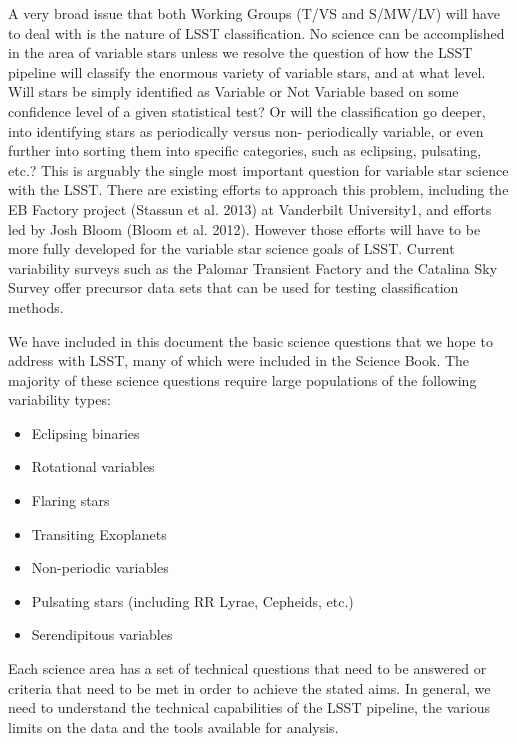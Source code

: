 A very broad issue that both Working Groups (T/VS and S/MW/LV) will have to deal with is the nature of LSST classification. No science can be accomplished in the area of variable stars unless we resolve the question of how the LSST pipeline will classify the enormous variety of variable stars, and at what level. Will stars be simply identified as Variable or Not Variable based on some confidence level of a given statistical test? Or will the classification go deeper, into identifying stars as periodically versus non- periodically variable, or even further into sorting them into specific categories, such as eclipsing, pulsating, etc.? This is arguably the single most important question for variable star science with the LSST. There are existing efforts to approach this problem, including the EB Factory project (Stassun et al. 2013) at Vanderbilt University1, and efforts led by Josh Bloom (Bloom et al. 2012). However those efforts will have to be more fully developed for the variable star science goals of LSST. Current variability surveys such as the Palomar Transient Factory and the Catalina Sky Survey offer precursor data sets that can be used for testing classification methods. 

We have included in this document the basic science questions that we hope to address with LSST, many of which were included in the Science Book. The majority of these science questions require large populations of the following variability types: 
\begin{itemize}
\item Eclipsing binaries 
\item Rotational variables 
\item Flaring stars 
\item Transiting Exoplanets 
\item Non-periodic variables 
\item Pulsating stars (including RR Lyrae, Cepheids, etc.) 
\item Serendipitous variables 
\end{itemize}

Each science area has a set of technical questions that need to be answered or criteria that need to be met in order to achieve the stated aims. In general, we need to understand the technical capabilities of the LSST pipeline, the various limits on the data and the tools available for analysis. 

